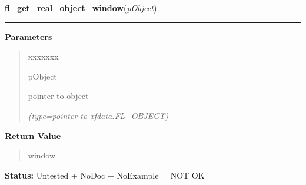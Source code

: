     \vspace{0.5ex}

\hspace{.8\funcindent}\begin{boxedminipage}{\funcwidth}

    \raggedright \textbf{fl\_get\_real\_object\_window}(\textit{pObject})

    \vspace{-1.5ex}

    \rule{\textwidth}{0.5\fboxrule}
\setlength{\parskip}{2ex}
\setlength{\parskip}{1ex}
      \textbf{Parameters}
      \vspace{-1ex}

      \begin{quote}
        \begin{Ventry}{xxxxxxx}

          \item[pObject]

          pointer to object

            {\it (type=pointer to xfdata.FL\_OBJECT)}

        \end{Ventry}

      \end{quote}

      \textbf{Return Value}
    \vspace{-1ex}

      \begin{quote}
      window

      \end{quote}

\textbf{Status:} Untested + NoDoc + NoExample = NOT OK



    \end{boxedminipage}

    \label{xformslib:library:FL_ObjWin}

    \vspace{0.5ex}


